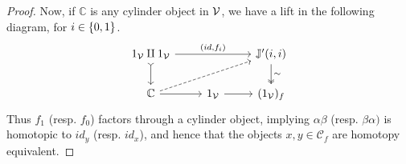 \documentclass[a4paper,10pt
]{article}%
\newcommand{\J}{\mathbb J}
\renewcommand{\1}{\ensuremath{\mathbb{id}}}
\begin{document}
\begin{proof}
      Now, if $\mathbb C$ is any cylinder object in $\mathcal V$, we have a lift in the following diagram, for $i \in \left\{0,1\right\}$.
      \begin{equation}
            \label{J11_CYL_EQ}
            \begin{tikzcd}
                  1_\V \amalg 1_\V \arrow[rr, "{(id, f_i)}"] \arrow[d, tail]
                  &&
                  \J'(i,i) \arrow[d, "\sim", two heads]
                  \\
                  \mathbb C \arrow[r] \arrow[urr, dashed]
                  &
                  1_\V \arrow[r]
                  &
                  (1_\V)_f
              \end{tikzcd}
        \end{equation}
        Thus $f_1$ (resp. $f_0$) factors through a cylinder object,
        implying $\alpha\beta$ (resp. $\beta\alpha)$ is homotopic to $id_y$ (resp. $id_x$),
        and hence that the objects $x,y\in \mathcal C_f$ are homotopy equivalent.
  \end{proof}
  
\end{document}
